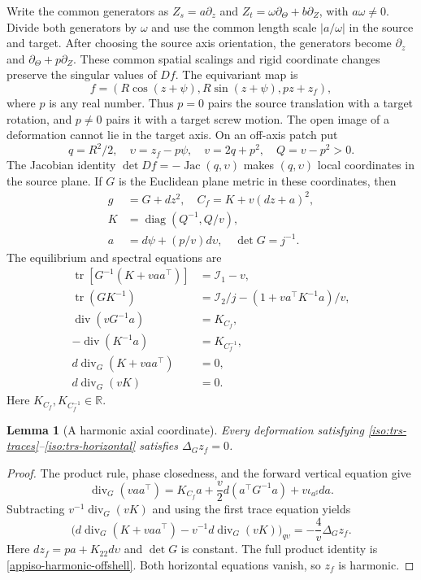 \documentclass[11pt,a4paper]{article}
\numberwithin{equation}{section}
\theoremstyle{plain}
\newtheorem{lemma}[theorem]{Lemma}
\theoremstyle{definition}
\theoremstyle{remark}
\begin{document}
Write the common generators as $Z_s=a\partial_z$ and
$Z_t=\omega\partial_\Theta+b\partial_Z$, with $a\omega\ne0$.
Divide both generators by $\omega$ and use the common length scale
$|a/\omega|$ in the source and target. After choosing the source axis
orientation, the generators become $\partial_z$ and
$\partial_\Theta+p\partial_Z$. These common spatial scalings and rigid
coordinate changes preserve the singular values of $Df$. The equivariant map is
\begin{equation}\label{iso:trs-map}
 f=(R\cos(z+\psi),R\sin(z+\psi),pz+z_f),
\end{equation}
where $p$ is any real number.  Thus $p=0$ pairs the source translation with a target rotation,
and $p\ne0$ pairs it with a target screw motion.  The open image of a deformation cannot lie in the target axis.  On an off-axis
patch put
\[
 q=R^2/2,\quad \upsilon=z_f-p\psi,\quad v=2q+p^2,\quad Q=v-p^2>0.
\]
The Jacobian identity $\det Df=-\operatorname{Jac}(q,\upsilon)$ makes
$(q,\upsilon)$ local coordinates in the source plane.  If $G$ is the Euclidean
plane metric in these coordinates, then
\begin{equation}\label{iso:trs-metrics}
 \begin{aligned}
 g&=G+dz^2,\quad C_f=K+v(dz+a)^2,\\
 K&=\operatorname{diag}(Q^{-1},Q/v),\\
 a&=d\psi+(p/v)d\upsilon,\quad \det G=j^{-1}.
 \end{aligned}
\end{equation}
The equilibrium and spectral equations are
\begin{align}
 \operatorname{tr}[G^{-1}(K+vaa^{\top})]&=\mathcal I_1-v,\nonumber\\
 \operatorname{tr}(GK^{-1})&=\mathcal I_2/j-(1+va^{\top}K^{-1}a)/v,
 \label{iso:trs-traces}\\
 \operatorname{div}(vG^{-1}a)&=K_{C_f},\nonumber\\
 -\operatorname{div}(K^{-1}a)&=K_{C_f^{-1}},\label{iso:trs-vertical}\\
 d\operatorname{div}_G(K+vaa^{\top})&=0,\nonumber\\
 d\operatorname{div}_G(vK)&=0.\label{iso:trs-horizontal}
\end{align}
Here $K_{C_f},K_{C_f^{-1}}\in\mathbb R$.

\begin{lemma}[A harmonic axial coordinate]\label{iso:harmonic}
Every deformation satisfying \eqref{iso:trs-traces}--\eqref{iso:trs-horizontal}
satisfies $\Delta_Gz_f=0$.
\end{lemma}
\begin{proof}
The product rule, phase closedness, and the forward vertical equation give
\[
 \operatorname{div}_G(vaa^{\top})
 =K_{C_f}a+\frac v2d(a^{\top}G^{-1}a)+v\iota_{a^\sharp}da.
\]
Subtracting $v^{-1}\operatorname{div}_G(vK)$ and using the first trace
equation yields
\[
 \bigl(d\operatorname{div}_G(K+vaa^{\top})
       -v^{-1}d\operatorname{div}_G(vK)\bigr)_{q\upsilon}
 =-\frac4v\Delta_Gz_f.
\]
Here $dz_f=pa+K_{22}d\upsilon$ and $\det G$ is constant.
The full product identity is \eqref{appiso-harmonic-offshell}.
Both horizontal equations vanish, so $z_f$ is harmonic.
\end{proof}
\end{document}
